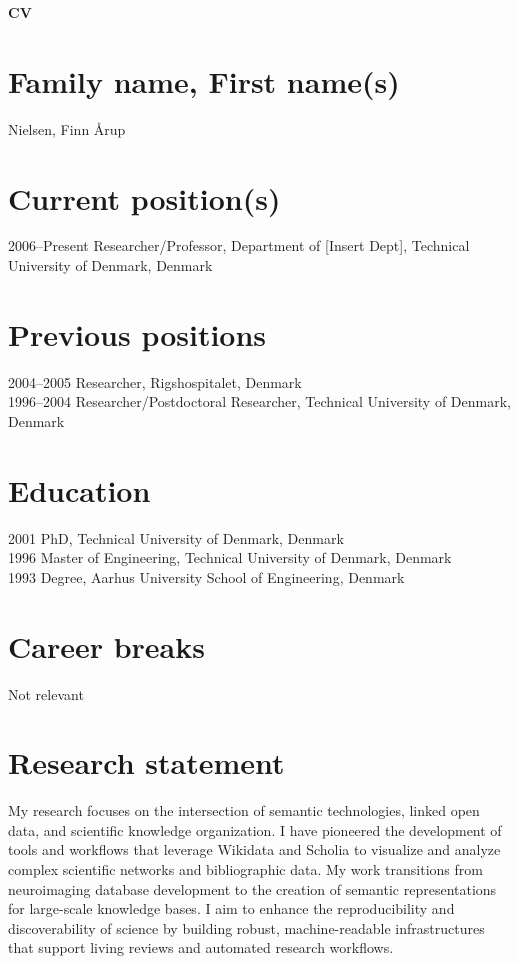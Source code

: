 \documentclass[12pt]{article}
\begin{document}
\begin{center}
    \textbf{\Large CV}
\end{center}

\section*{Family name, First name(s)}
Nielsen, Finn Årup

\section*{Current position(s)}
2006--Present \quad Researcher/Professor, Department of [Insert Dept], Technical University of Denmark, Denmark

\section*{Previous positions}
2004--2005 \quad Researcher, Rigshospitalet, Denmark \\
1996--2004 \quad Researcher/Postdoctoral Researcher, Technical University of Denmark, Denmark

\section*{Education}
2001 \quad PhD, Technical University of Denmark, Denmark \\
1996 \quad Master of Engineering, Technical University of Denmark, Denmark \\
1993 \quad Degree, Aarhus University School of Engineering, Denmark

\section*{Career breaks}
Not relevant

\section*{Research statement}
My research focuses on the intersection of semantic technologies, linked open data, and scientific knowledge organization. I have pioneered the development of tools and workflows that leverage Wikidata and Scholia to visualize and analyze complex scientific networks and bibliographic data. My work transitions from neuroimaging database development to the creation of semantic representations for large-scale knowledge bases. I aim to enhance the reproducibility and discoverability of science by building robust, machine-readable infrastructures that support living reviews and automated research workflows.
\end{document}
